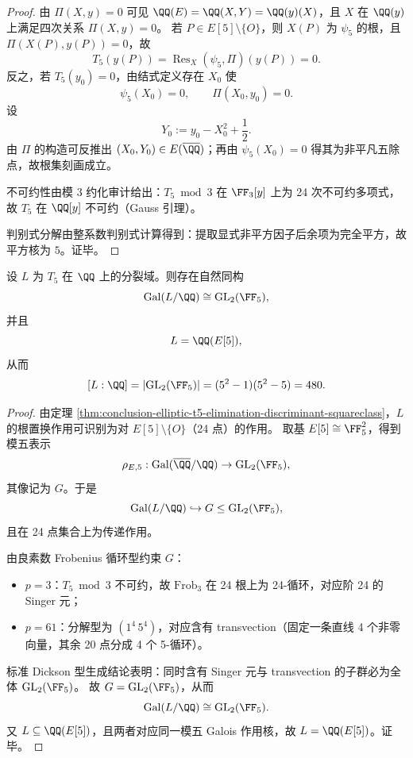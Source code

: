 \begin{proof}
由 \(\Pi(X,y)=0\) 可见 \(\QQ(E)=\QQ(X,Y)=\QQ(y)(X)\)，且 \(X\) 在 \(\QQ(y)\) 上满足四次关系 \(\Pi(X,y)=0\)。
若 \(P\in E[5]\setminus\{O\}\)，则 \(X(P)\) 为 \(\psi_5\) 的根，且 \(\Pi(X(P),y(P))=0\)，故
\[
T_5(y(P))=\operatorname{Res}_X(\psi_5,\Pi)(y(P))=0.
\]
反之，若 \(T_5(y_0)=0\)，由结式定义存在 \(X_0\) 使
\[
\psi_5(X_0)=0,\qquad \Pi(X_0,y_0)=0.
\]
设
\[
Y_0:=y_0-X_0^2+\frac12.
\]
由 \(\Pi\) 的构造可反推出 \((X_0,Y_0)\in E(\overline{\QQ})\)；再由 \(\psi_5(X_0)=0\) 得其为非平凡五除点，故根集刻画成立。

不可约性由模 \(3\) 约化审计给出：\(T_5\bmod 3\) 在 \(\FF_3[y]\) 上为 24 次不可约多项式，故 \(T_5\) 在 \(\QQ[y]\) 不可约（Gauss 引理）。

判别式分解由整系数判别式计算得到：提取显式非平方因子后余项为完全平方，故平方核为 \(5\)。证毕。
\end{proof}

\begin{theorem}\label{thm:conclusion-elliptic-t5-galois-gl2f5}
设 \(L\) 为 \(T_5\) 在 \(\QQ\) 上的分裂域。则存在自然同构
\[
\mathrm{Gal}(L/\QQ)\cong \mathrm{GL}_2(\FF_5),
\]
并且
\[
L=\QQ(E[5]),
\]
从而
\[
[L:\QQ]=|\mathrm{GL}_2(\FF_5)|=(5^2-1)(5^2-5)=480.
\]
\end{theorem}
\begin{proof}
由定理 \ref{thm:conclusion-elliptic-t5-elimination-discriminant-squareclass}，\(L\) 的根置换作用可识别为对 \(E[5]\setminus\{O\}\)（24 点）的作用。
取基 \(E[5]\cong \FF_5^2\)，得到模五表示
\[
\rho_{E,5}:\mathrm{Gal}(\overline{\QQ}/\QQ)\to \mathrm{GL}_2(\FF_5),
\]
其像记为 \(G\)。于是
\[
\mathrm{Gal}(L/\QQ)\hookrightarrow G\le \mathrm{GL}_2(\FF_5),
\]
且在 24 点集合上为传递作用。

由良素数 Frobenius 循环型约束 \(G\)：
\begin{itemize}
  \item \(p=3\)：\(T_5\bmod 3\) 不可约，故 \(\mathrm{Frob}_3\) 在 24 根上为 24-循环，对应阶 24 的 Singer 元；
  \item \(p=61\)：分解型为 \((1^4\,5^4)\)，对应含有 transvection（固定一条直线 4 个非零向量，其余 20 点分成 4 个 5-循环）。
\end{itemize}
标准 Dickson 型生成结论表明：同时含有 Singer 元与 transvection 的子群必为全体 \(\mathrm{GL}_2(\FF_5)\)。
故 \(G=\mathrm{GL}_2(\FF_5)\)，从而
\[
\mathrm{Gal}(L/\QQ)\cong \mathrm{GL}_2(\FF_5).
\]
又 \(L\subseteq \QQ(E[5])\)，且两者对应同一模五 Galois 作用核，故 \(L=\QQ(E[5])\)。证毕。
\end{proof}

